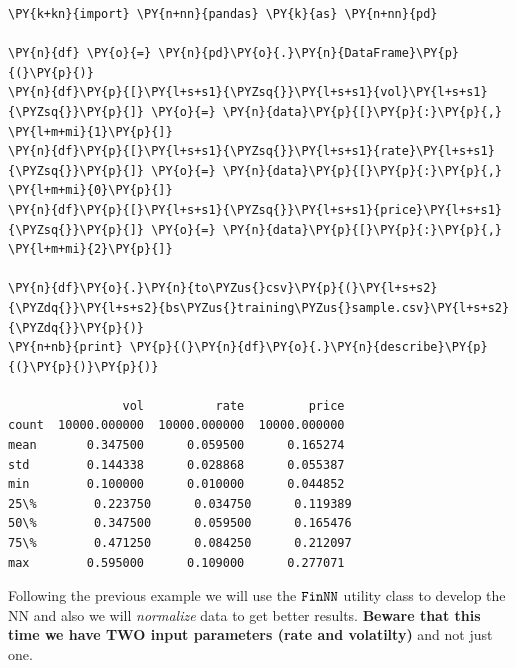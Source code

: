 \begin{tcolorbox}[breakable, size=fbox, boxrule=1pt, pad at break*=1mm,colback=cellbackground, colframe=cellborder]
\begin{Verbatim}[commandchars=\\\{\}]
\PY{k+kn}{import} \PY{n+nn}{pandas} \PY{k}{as} \PY{n+nn}{pd}
	
\PY{n}{df} \PY{o}{=} \PY{n}{pd}\PY{o}{.}\PY{n}{DataFrame}\PY{p}{(}\PY{p}{)}
\PY{n}{df}\PY{p}{[}\PY{l+s+s1}{\PYZsq{}}\PY{l+s+s1}{vol}\PY{l+s+s1}{\PYZsq{}}\PY{p}{]} \PY{o}{=} \PY{n}{data}\PY{p}{[}\PY{p}{:}\PY{p}{,} \PY{l+m+mi}{1}\PY{p}{]}
\PY{n}{df}\PY{p}{[}\PY{l+s+s1}{\PYZsq{}}\PY{l+s+s1}{rate}\PY{l+s+s1}{\PYZsq{}}\PY{p}{]} \PY{o}{=} \PY{n}{data}\PY{p}{[}\PY{p}{:}\PY{p}{,} \PY{l+m+mi}{0}\PY{p}{]}
\PY{n}{df}\PY{p}{[}\PY{l+s+s1}{\PYZsq{}}\PY{l+s+s1}{price}\PY{l+s+s1}{\PYZsq{}}\PY{p}{]} \PY{o}{=} \PY{n}{data}\PY{p}{[}\PY{p}{:}\PY{p}{,} \PY{l+m+mi}{2}\PY{p}{]}
	
\PY{n}{df}\PY{o}{.}\PY{n}{to\PYZus{}csv}\PY{p}{(}\PY{l+s+s2}{\PYZdq{}}\PY{l+s+s2}{bs\PYZus{}training\PYZus{}sample.csv}\PY{l+s+s2}{\PYZdq{}}\PY{p}{)}
\PY{n+nb}{print} \PY{p}{(}\PY{n}{df}\PY{o}{.}\PY{n}{describe}\PY{p}{(}\PY{p}{)}\PY{p}{)}

                vol          rate         price
count  10000.000000  10000.000000  10000.000000
mean       0.347500      0.059500      0.165274
std        0.144338      0.028868      0.055387
min        0.100000      0.010000      0.044852
25\%        0.223750      0.034750      0.119389
50\%        0.347500      0.059500      0.165476
75\%        0.471250      0.084250      0.212097
max        0.595000      0.109000      0.277071
\end{Verbatim}
\end{tcolorbox}

Following the previous example we will use the \(\tt{FinNN}\) utility
class to develop the NN and also we will \emph{normalize} data to get
better results. \textbf{Beware that this time we have TWO input
parameters (rate and volatilty)} and not just one.


